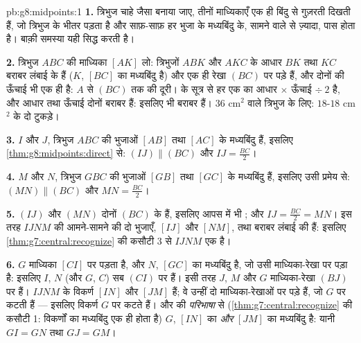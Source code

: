 \begin{solution}{pb:g8:midpoints:1}
\textbf{1.} त्रिभुज चाहे जैसा बनाया जाए, तीनों माध्यिकाएँ एक ही
बिंदु से गुज़रती दिखती हैं, जो त्रिभुज के भीतर पड़ता है और
साफ़-साफ़ हर भुजा के मध्यबिंदु के, सामने वाले  से ज़्यादा,
पास होता है। बाक़ी समस्या यही सिद्ध करती है।

\textbf{2.} त्रिभुज $ABC$ की माध्यिका $[AK]$ लो: त्रिभुजों $ABK$
और $AKC$ के आधार $BK$ तथा $KC$ बराबर लंबाई के हैं ($K$, $[BC]$ का
मध्यबिंदु है) और एक ही रेखा $(BC)$ पर पड़े हैं, और दोनों की ऊँचाई
भी एक ही है: $A$ से $(BC)$ तक की दूरी।  के सूत्र से हर एक
का  आधार $\times$ ऊँचाई $\div\ 2$ है, और आधार तथा ऊँचाई
दोनों बराबर हैं: इसलिए  भी बराबर हैं। $36$ cm$^2$
 वाले त्रिभुज के लिए: $18$-$18$ cm$^2$ के दो टुकड़े।

\textbf{3.} $I$ और $J$, त्रिभुज $ABC$ की भुजाओं $[AB]$ तथा $[AC]$
के मध्यबिंदु हैं, इसलिए \cref{thm:g8:midpoints:direct} से:
$(IJ) \parallel (BC)$ और $IJ = \frac{BC}{2}$।

\textbf{4.} $M$ और $N$, त्रिभुज $GBC$ की भुजाओं $[GB]$ तथा $[GC]$
के मध्यबिंदु हैं, इसलिए उसी प्रमेय से: $(MN) \parallel (BC)$ और
$MN = \frac{BC}{2}$।

\textbf{5.} $(IJ)$ और $(MN)$ दोनों $(BC)$ के  हैं, इसलिए
आपस में भी ; और $IJ = \frac{BC}{2} = MN$। इस तरह 
$IJNM$ की आमने-सामने की दो भुजाएँ, $[IJ]$ और $[NM]$,  तथा
बराबर लंबाई की हैं: इसलिए \cref{thm:g7:central:recognize} की कसौटी
3 से $IJNM$ एक  है।

\textbf{6.} $G$ माध्यिका $[CI]$ पर पड़ता है, और $N$, $[GC]$ का
मध्यबिंदु है, जो उसी माध्यिका-रेखा पर पड़ा  है: इसलिए $I$,
$N$ (और $G$, $C$) सब $(CI)$ पर हैं। इसी तरह $J$, $M$ और $G$
माध्यिका-रेखा $(BJ)$ पर हैं।  $IJNM$ के विकर्ण
$[IN]$ और $[JM]$ हैं; वे उन्हीं दो माध्यिका-रेखाओं पर पड़े हैं, जो
$G$ पर कटती हैं --- इसलिए विकर्ण $G$ पर कटते हैं। और  की \emph{परिभाषा} से (\cref{thm:g7:central:recognize} की
कसौटी 1: विकर्णों का मध्यबिंदु एक ही होता है) $G$, $[IN]$ का
\emph{और} $[JM]$ का मध्यबिंदु है: यानी $GI = GN$ तथा $GJ = GM$।


\end{solution}
